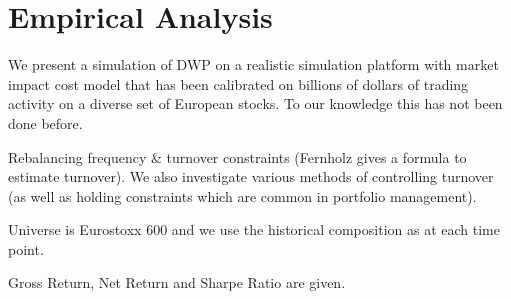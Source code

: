 \documentclass[british]{amsart} \usepackage{lmodern}
\numberwithin{equation}{section} \numberwithin{figure}{section}
\theoremstyle{plain} \newtheorem{thm}{\protect\theoremname}[section]
\theoremstyle{definition} \newtheorem{defn}[thm]{\protect\definitionname}
\theoremstyle{plain} \newtheorem{assumption}[thm]{\protect\assumptionname}
\theoremstyle{plain} \newtheorem{lem}[thm]{\protect\lemmaname}
\theoremstyle{plain} \newtheorem{prop}[thm]{\protect\propositionname}
\theoremstyle{remark} \newtheorem{rem}[thm]{\protect\remarkname}
\theoremstyle{plain} \newtheorem{cor}[thm]{\protect\corollaryname}
\begin{document}
\section{Empirical Analysis}

We present a simulation of DWP  on a realistic simulation platform
with market impact cost model that has been calibrated on billions
of dollars of trading activity on a diverse set of European stocks.
To our knowledge this has not been done before. 

Rebalancing frequency \& turnover constraints (Fernholz gives a formula
to estimate turnover). We also investigate various methods of controlling
turnover (as well as holding constraints which are common in portfolio
management).

Universe is Eurostoxx 600 and we use the historical composition as
at each time point.

Gross Return, Net Return and Sharpe Ratio are given.



\printbibliography
\end{document}
